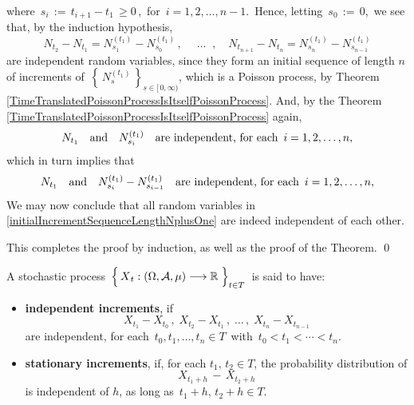 where \,$s_{i} \,:=\, t_{i+1} - t_{1} \,\geq 0\,$,\,
for \,$i = 1, 2, \ldots, n-1$.\,
Hence, letting \,$s_{0} \,:=\, 0$,\, we see that, by the induction hypothesis,
\begin{equation*}
N_{t_{2}} - N_{t_{1}} = N^{(t_{1})}_{s_{1}} - N^{(t_{1})}_{s_{0}}\,,\;
\quad\ldots\;\;,\quad
N_{t_{n+1}} - N_{t_{n}} = N^{(t_{1})}_{s_{n}} - N^{(t_{1})}_{s_{n-1}}
\end{equation*}
are independent random variables, since they form
an initial sequence of length $n$ of increments of
\,$\left\{\,N^{(t_{1})}_{s}\,\right\}_{s\in[\,0,\infty)}$,
which is a Poisson process,
by Theorem \ref{TimeTranslatedPoissonProcessIsItselfPoissonProcess}.
And, by the Theorem \ref{TimeTranslatedPoissonProcessIsItselfPoissonProcess} again,
\begin{equation*}
N_{t_{1}}
\quad\textnormal{and}\quad
N^{(t_{1})}_{s_{i}}
\quad
\textnormal{are independent, for each \,$i = 1,2,\ldots, n$},
\end{equation*}
which in turn implies that
\begin{equation*}
N_{t_{1}}
\quad\textnormal{and}\quad
N^{(t_{1})}_{s_{i}} - N^{(t_{1})}_{s_{i-1}}
\quad
\textnormal{are independent, for each \,$i = 1,2,\ldots, n$},
\end{equation*}
We may now conclude that all random variables in
\eqref{initialIncrementSequenceLengthNplusOne}
are indeed independent of each other.

\vskip 0.3cm
\noindent
This completes the proof by induction, as well as the proof of the Theorem.
\qed


\vskip 1.0cm
\begin{definition}
\mbox{}
\vskip 0.1cm
\noindent
A stochastic process
\,$\left\{\,\overset{{\color{white}.}}{X}_{t} : (\Omega,\mathcal{A},\mu) \longrightarrow \Re \;\right\}_{t \in T}$\,
is said to have:
\begin{itemize}
\item
	\textbf{independent increments}, if
	\begin{equation*}
	X_{t_{1}} - X_{t_{0}}\,,\;
	X_{t_{2}} - X_{t_{1}}\,,\;
	\ldots\,,\;
	X_{t_{n}} - X_{t_{n-1}}
	\end{equation*}
	are independent, for each \,$t_{0}, t_{1}, \ldots, t_{n} \in T$\,
	with \,$t_{0} < t_{1} < \cdots < t_{n}$.
\item
	\textbf{stationary increments}, if,
	for each $t_{1},\, t_{2} \in T$, the probability distribution of
	\begin{equation*}
	X_{t_{1}+h} \,-\, X_{t_{2}+h}
	\end{equation*}
	is independent of $h$, as long as \,$t_{1} + h,\, t_{2} + h \in T$.
\end{itemize}
\end{definition}

